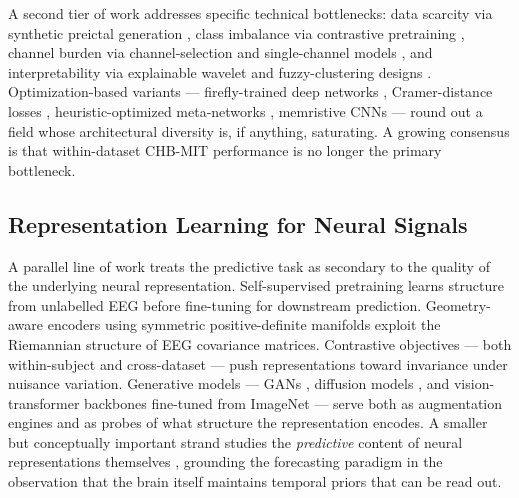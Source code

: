 A second tier of work addresses specific technical bottlenecks: data scarcity via synthetic preictal generation \cite{XuEtAl2022,JiangEtAl2024a,CinquettiEtAl2025}, class imbalance via contrastive pretraining \cite{GuoEtAl2023,QiEtAl2025}, channel burden via channel-selection and single-channel models \cite{WangEtAl2021a,JangEtAl2026,WangEtAl2026a,Cherouati2023}, and interpretability via explainable wavelet and fuzzy-clustering designs \cite{WangEtAl2025b,WangEtAl2026b,SuffianEtAl2025}. Optimization-based variants --- firefly-trained deep networks \cite{PN2024}, Cramer-distance losses \cite{GhanimiEtAl2024}, heuristic-optimized meta-networks \cite{SEtAl2025}, memristive CNNs \cite{LiEtAl2022} --- round out a field whose architectural diversity is, if anything, saturating. A growing consensus \cite{WuEtAl2025,TanEtAl2025,RenEtAl2022,WongEtAl2023} is that within-dataset CHB-MIT performance is no longer the primary bottleneck.

\subsection{Representation Learning for Neural Signals}
\label{sec:rw-repr}

A parallel line of work treats the predictive task as secondary to the quality of the underlying neural representation. Self-supervised pretraining \cite{BanvilleEtAl2020,JiangEtAl2024b,BaryMacq2024} learns structure from unlabelled EEG before fine-tuning for downstream prediction. Geometry-aware encoders using symmetric positive-definite manifolds \cite{PaillardEtAl2025,ChenEtAl2026a} exploit the Riemannian structure of EEG covariance matrices. Contrastive objectives --- both within-subject \cite{GuoEtAl2023,QiEtAl2025} and cross-dataset \cite{LiaoEtAl2024} --- push representations toward invariance under nuisance variation. Generative models --- GANs \cite{XuEtAl2022,CinquettiEtAl2025,YinEtAl2026}, diffusion models \cite{JiangEtAl2024a,PuahEtAl2025}, and vision-transformer backbones fine-tuned from ImageNet \cite{YangModesitt2023,HoffsommerEtAl2025} --- serve both as augmentation engines and as probes of what structure the representation encodes. A smaller but conceptually important strand studies the \emph{predictive} content of neural representations themselves \cite{GunasekaranEtAl2025,ChenEtAl2026b,KölblEtAl2025,AkamaEtAl2025,BalarKapila2025,DercksenEtAl2026,EguinoaEtAl2026}, grounding the forecasting paradigm in the observation that the brain itself maintains temporal priors that can be read out.

